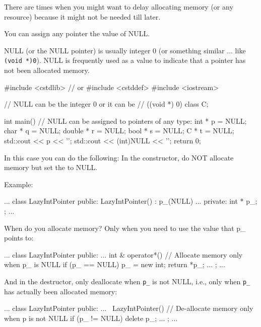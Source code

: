 \newpage{}

There are times when you might want to delay allocating memory (or any
resource) because it might not be needed till later.

You can assign any pointer the value of NULL.

NULL (or the NULL pointer) is usually integer 0 (or something similar
... like \texttt{(void *)0}). NULL is frequently used as a value to
indicate that a pointer has not been allocated memory.

\begin{consolethree}[escapeinside=||]
#include <cstdlib> // or #include <cstddef>
#include <iostream>

// NULL can be the integer 0 or it can be
// ((void *) 0)
class C{};

int main()
{
    // NULL can be assigned to pointers of any type:
    int * p = NULL;
    char * q = NULL;
    double * r = NULL;
    bool * s = NULL;
    C * t = NULL;
    std::cout << p << '\n';
    std::cout << (int)NULL << '\n';
    return 0;
}
\end{consolethree}

In this case you can do the following: In the constructor, do NOT
allocate memory but set the  to NULL.

Example:

\begin{consolethree}[escapeinside=||]
...
class LazyIntPointer
{
public:
    LazyIntPointer()
        : p_(NULL)
    {}
    ...
private:
    int * p_;
};
...
\end{consolethree}

When do you allocate memory? Only when you need to use the value that
p\_ points to:

\begin{consolethree}[escapeinside=||]
...
class LazyIntPointer
{
public:
    ...
    int & operator*()
    {
        // Allocate memory only when p_ is NULL
        if (p_ == NULL)
        {
            p_ = new int;
        }
        return *p_;
    }
    ...
};
...
\end{consolethree}

And in the destructor, only deallocate when \texttt{p\_} is not NULL,
i.e., only when \texttt{p\_} has actually been allocated memory:

\begin{consolethree}[escapeinside=||]
...
class LazyIntPointer
{
public:
    ...
    ~LazyIntPointer()
    {
        // De-allocate memory only when p is not NULL
        if (p_ != NULL)
        {
            delete p_;
        }
    }
    ...
};
...
\end{consolethree}

